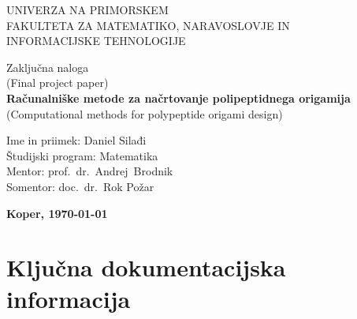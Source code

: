 \documentclass[12pt,a4paper,titlepage,openany]{report}
\newcommand{\titleSI}{Računalniške metode za načrtovanje
	polipeptidnega origamija}
\newcommand{\mentorSI}{prof.~dr.~Andrej~Brodnik}
\newcommand{\comentorSI}{doc.~dr.~Rok Požar}
\begin{document}
\pagestyle{empty}
\begin{center}
\noindent \large UNIVERZA NA PRIMORSKEM\\
\large FAKULTETA ZA MATEMATIKO, NARAVOSLOVJE IN\\
INFORMACIJSKE TEHNOLOGIJE


\normalsize
\vspace{5.5cm}
Zaklju\v cna naloga\\
(Final project paper)\\
\textbf{\large \titleSI}\\
\normalsize
(Computational methods for polypeptide origami design)\\
\end{center}

\begin{flushleft}
\vspace{5cm}
\noindent Ime in priimek: Daniel Silađi
\\
\noindent \v Studijski program: Matematika
\\
\noindent Mentor: \mentorSI
\\
\noindent Somentor: \comentorSI
\\
\end{flushleft}

\vspace{4cm}
\begin{center}
\large \textbf{Koper, \today{}}
\end{center}
\newpage

\pagestyle{fancy}

\section*{Klju\v cna dokumentacijska informacija}
\end{document}
